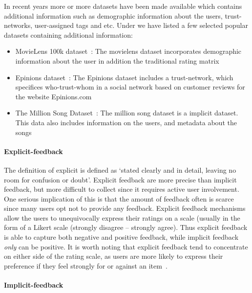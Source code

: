 In recent years more or more datasets have been made available which contains
additional information such as demographic information about the users,
trust-networks, user-assigned tags and etc. Under we have listed a few selected
popular datasets containing additional information:


\begin{itemize}

\item MovieLens 100k dataset~\cite{Movielens}: The movielens dataset
	incorporates demographic information about the user in addition the
	traditional rating matrix

\item Epinions dataset~\cite{Epinions}: The Epinions dataset includes a
	trust-network, which specifices who-trust-whom in a social network based on
	customer reviews for the website Epinions.com

\item The Million Song Dataset~\cite{Bertin-Mahieux2011}: The million song
	dataset is a implicit dataset. This data also includes information on the users,
	and metadata about the songs
\end{itemize}

\paragraph{Explicit-feedback}

The definition of explicit is defined as `stated clearly and in detail, leaving
no room for confusion or doubt'. Explicit feedback are more precise than
implicit feedback, but more difficult to collect since it requires active user
involvement. One serious implication of this is that the amount of feedback
often is scarce since many users opt not to provide any feedback. Explicit
feedback mechanisms allow the users to unequivocally express their ratings on a
scale (usually in the form of a Likert scale (strongly disagree – strongly
agree). Thus explicit feedback is able to capture both negative and positive
feedback, while implicit feedback \emph{only} can be positive. It is worth
noting that explicit feedback tend to concentrate on either side of the rating
scale, as users are more likely to express their preference if they feel
strongly for or against an item~\cite{Jawaheer2010}.

\paragraph{Implicit-feedback}

